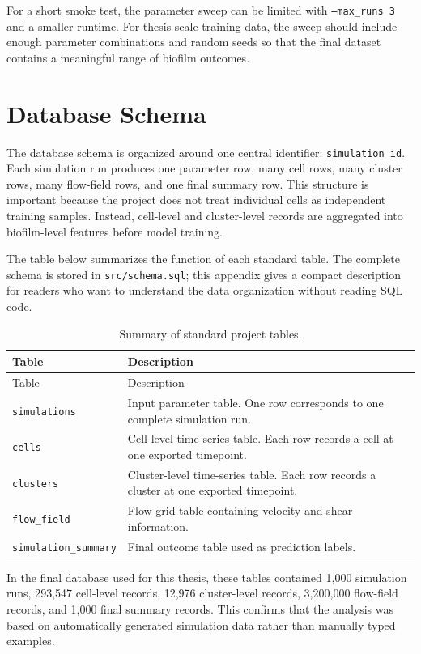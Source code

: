 \documentclass[12pt,a4paper,oneside]{report}
\begin{document}
For a short smoke test, the parameter sweep can be limited with \texttt{--max\_runs 3} and a smaller runtime. For thesis-scale training data, the sweep should include enough parameter combinations and random seeds so that the final dataset contains a meaningful range of biofilm outcomes.

\chapter{Database Schema}
The database schema is organized around one central identifier: \texttt{simulation\_id}. Each simulation run produces one parameter row, many cell rows, many cluster rows, many flow-field rows, and one final summary row. This structure is important because the project does not treat individual cells as independent training samples. Instead, cell-level and cluster-level records are aggregated into biofilm-level features before model training.

The table below summarizes the function of each standard table. The complete schema is stored in \texttt{src/schema.sql}; this appendix gives a compact description for readers who want to understand the data organization without reading SQL code.

\begingroup
\small
\setlength{\tabcolsep}{5pt}
\begin{longtable}{>{\raggedright\arraybackslash}p{}>{\raggedright\arraybackslash}p{}}
\caption{Summary of standard project tables.}\\
\toprule
Table & Description\\
\midrule
\endfirsthead
\toprule
Table & Description\\
\midrule
\endhead
\texttt{simulations} & Input parameter table. One row corresponds to one complete simulation run.\\
\texttt{cells} & Cell-level time-series table. Each row records a cell at one exported timepoint.\\
\texttt{clusters} & Cluster-level time-series table. Each row records a cluster at one exported timepoint.\\
\texttt{flow\_field} & Flow-grid table containing velocity and shear information.\\
\texttt{simulation\_summary} & Final outcome table used as prediction labels.\\
\bottomrule
\end{longtable}
\endgroup

In the final database used for this thesis, these tables contained 1,000 simulation runs, 293,547 cell-level records, 12,976 cluster-level records, 3,200,000 flow-field records, and 1,000 final summary records. This confirms that the analysis was based on automatically generated simulation data rather than manually typed examples.
\end{document}
